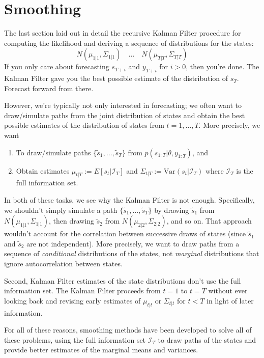 \documentclass[a4paper,12pt]{article}
\begin{document}
\clearpage
\section{Smoothing}

The last section laid out in detail the recursive Kalman Filter
procedure for computing the likelihood and deriving a sequence of
distributions for the states:
\begin{equation}
  \label{distseq}
  N(\mu_{1|1}, \Sigma_{1|1}) \quad \ldots \quad  N(\mu_{T|T}, \Sigma_{T|T})
\end{equation}
If you only care about forecasting $s_{T+i}$ and $y_{T+i}$ for $i>0$,
then you're done.  The Kalman Filter gave you the best possible estimate
of the distribution of $s_T$.  Forecast forward from there.

However, we're typically not only interested in forecasting; we often
want to draw/simulate paths from the joint distribution of states and
obtain the best possible estimates of the distribution of states
from $t=1,\ldots,T$. More precisely, we want
\begin{enumerate}
  \item To draw/simulate paths $\{\tilde{s}_1,\ldots,\tilde{s}_T\}$
    from $p(s_{1:T}|\theta, y_{1:T})$, and
  \item Obtain estimates $\mu_{t|T} := E[s_t|\mathcal{I}_T]$ and
    $\Sigma_{t|T} := \text{Var}(s_t|\mathcal{I}_T)$ where
    $\mathcal{I}_T$ is the full information set.
\end{enumerate}

In both of these tasks, we see why the Kalman Filter is not enough.
Specifically, we shouldn't simply simulate a path
$\{\tilde{s}_1,\ldots,\tilde{s}_T\}$ by drawing $\tilde{s}_1$ from
$N(\mu_{1|1}, \Sigma_{1|1})$, then drawing $\tilde{s}_2$ from
$N(\mu_{2|2}, \Sigma_{2|2})$, and so on. That approach wouldn't account
for the correlation between successive draws of states (since
$\tilde{s}_1$ and $\tilde{s}_2$ are not independent). More precisely, we
want to draw paths from a sequence of \emph{conditional} distributions
of the states, not \emph{marginal} distributions that ignore
autocorrelation between states.

Second, Kalman Filter estimates of the state distributions don't use the
full information set.  The Kalman Filter proceeds from $t=1$ to $t=T$
without ever looking back and revising early estimates of
$\mu_{t|t}$ or $\Sigma_{t|t}$ for $t<T$ in light of later
information.

For all of these reasons, smoothing methods have been developed to solve
all of these problems, using the full information set $\mathcal{I}_T$ to
draw paths of the states and provide better estimates of the marginal
means and variances.
\end{document}
